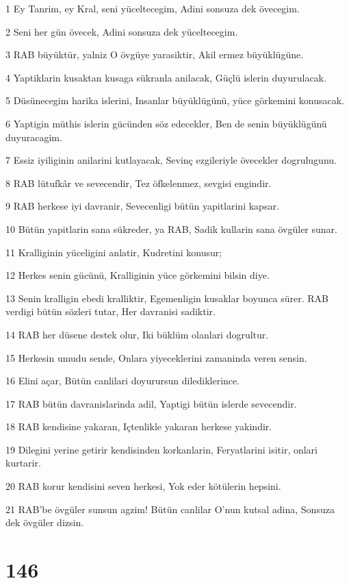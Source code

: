\par 1 Ey Tanrim, ey Kral, seni yüceltecegim, Adini sonsuza dek övecegim.
\par 2 Seni her gün övecek, Adini sonsuza dek yüceltecegim.
\par 3 RAB büyüktür, yalniz O övgüye yarasiktir, Akil ermez büyüklügüne.
\par 4 Yaptiklarin kusaktan kusaga sükranla anilacak, Güçlü islerin duyurulacak.
\par 5 Düsünecegim harika islerini, Insanlar büyüklügünü, yüce görkemini konusacak.
\par 6 Yaptigin müthis islerin gücünden söz edecekler, Ben de senin büyüklügünü duyuracagim.
\par 7 Essiz iyiliginin anilarini kutlayacak, Sevinç ezgileriyle övecekler dogrulugunu.
\par 8 RAB lütufkâr ve sevecendir, Tez öfkelenmez, sevgisi engindir.
\par 9 RAB herkese iyi davranir, Sevecenligi bütün yapitlarini kapsar.
\par 10 Bütün yapitlarin sana sükreder, ya RAB, Sadik kullarin sana övgüler sunar.
\par 11 Kralliginin yüceligini anlatir, Kudretini konusur;
\par 12 Herkes senin gücünü, Kralliginin yüce görkemini bilsin diye.
\par 13 Senin kralligin ebedi kralliktir, Egemenligin kusaklar boyunca sürer. RAB verdigi bütün sözleri tutar, Her davranisi sadiktir.
\par 14 RAB her düsene destek olur, Iki büklüm olanlari dogrultur.
\par 15 Herkesin umudu sende, Onlara yiyeceklerini zamaninda veren sensin.
\par 16 Elini açar, Bütün canlilari doyurursun dilediklerince.
\par 17 RAB bütün davranislarinda adil, Yaptigi bütün islerde sevecendir.
\par 18 RAB kendisine yakaran, Içtenlikle yakaran herkese yakindir.
\par 19 Dilegini yerine getirir kendisinden korkanlarin, Feryatlarini isitir, onlari kurtarir.
\par 20 RAB korur kendisini seven herkesi, Yok eder kötülerin hepsini.
\par 21 RAB'be övgüler sunsun agzim! Bütün canlilar O'nun kutsal adina, Sonsuza dek övgüler dizsin.

\chapter{146}

